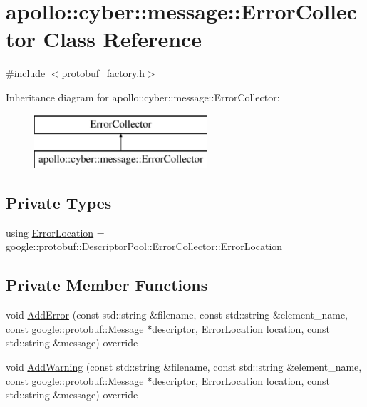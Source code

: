 \hypertarget{classapollo_1_1cyber_1_1message_1_1ErrorCollector}{\section{apollo\-:\-:cyber\-:\-:message\-:\-:Error\-Collector Class Reference}
\label{classapollo_1_1cyber_1_1message_1_1ErrorCollector}
}


{\ttfamily \#include $<$protobuf\-\_\-factory.\-h$>$}

Inheritance diagram for apollo\-:\-:cyber\-:\-:message\-:\-:Error\-Collector\-:\begin{figure}[H]
\begin{center}
\leavevmode
\includegraphics[height=2.000000cm]{classapollo_1_1cyber_1_1message_1_1ErrorCollector}
\end{center}
\end{figure}
\subsection*{Private Types}
\begin{DoxyCompactItemize}
\item 
using \hyperlink{classapollo_1_1cyber_1_1message_1_1ErrorCollector_ac39eb350844e7897054ed7552e67a64b}{Error\-Location} = google\-::protobuf\-::\-Descriptor\-Pool\-::\-Error\-Collector\-::\-Error\-Location
\end{DoxyCompactItemize}
\subsection*{Private Member Functions}
\begin{DoxyCompactItemize}
\item 
void \hyperlink{classapollo_1_1cyber_1_1message_1_1ErrorCollector_aff2683e6605e847d7a6b4ffbf86d32fb}{Add\-Error} (const std\-::string \&filename, const std\-::string \&element\-\_\-name, const google\-::protobuf\-::\-Message $\ast$descriptor, \hyperlink{classapollo_1_1cyber_1_1message_1_1ErrorCollector_ac39eb350844e7897054ed7552e67a64b}{Error\-Location} location, const std\-::string \&message) override
\item 
void \hyperlink{classapollo_1_1cyber_1_1message_1_1ErrorCollector_a9f447ed3a2bdd079f0501131040f71da}{Add\-Warning} (const std\-::string \&filename, const std\-::string \&element\-\_\-name, const google\-::protobuf\-::\-Message $\ast$descriptor, \hyperlink{classapollo_1_1cyber_1_1message_1_1ErrorCollector_ac39eb350844e7897054ed7552e67a64b}{Error\-Location} location, const std\-::string \&message) override
\end{DoxyCompactItemize}


